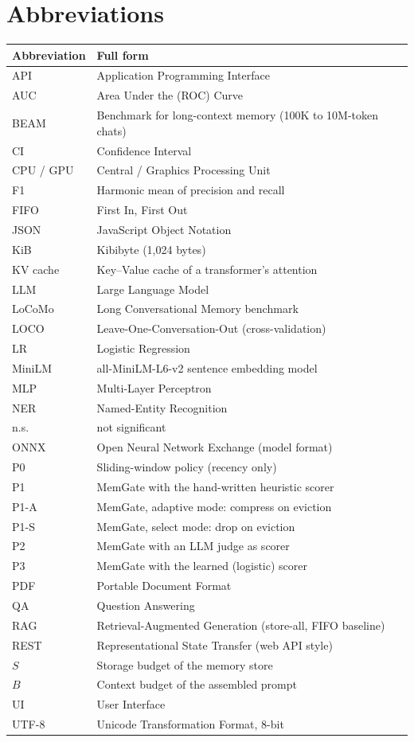 \chapter*{Abbreviations}
\begin{center}
\begin{longtable}{@{}p{3.2cm}p{10.5cm}@{}}
\toprule
\textbf{Abbreviation} & \textbf{Full form} \\
\midrule
\endhead
API & Application Programming Interface \\
AUC & Area Under the (ROC) Curve \\
BEAM & Benchmark for long-context memory (100K to 10M-token chats) \\
CI & Confidence Interval \\
CPU / GPU & Central / Graphics Processing Unit \\
F1 & Harmonic mean of precision and recall \\
FIFO & First In, First Out \\
JSON & JavaScript Object Notation \\
KiB & Kibibyte (1{,}024 bytes) \\
KV cache & Key--Value cache of a transformer's attention \\
LLM & Large Language Model \\
LoCoMo & Long Conversational Memory benchmark \\
LOCO & Leave-One-Conversation-Out (cross-validation) \\
LR & Logistic Regression \\
MiniLM & all-MiniLM-L6-v2 sentence embedding model \\
MLP & Multi-Layer Perceptron \\
NER & Named-Entity Recognition \\
n.s. & not significant \\
ONNX & Open Neural Network Exchange (model format) \\
P0 & Sliding-window policy (recency only) \\
P1 & MemGate with the hand-written heuristic scorer \\
P1-A & MemGate, adaptive mode: compress on eviction \\
P1-S & MemGate, select mode: drop on eviction \\
P2 & MemGate with an LLM judge as scorer \\
P3 & MemGate with the learned (logistic) scorer \\
PDF & Portable Document Format \\
QA & Question Answering \\
RAG & Retrieval-Augmented Generation (store-all, FIFO baseline) \\
REST & Representational State Transfer (web API style) \\
$S$ & Storage budget of the memory store \\
$B$ & Context budget of the assembled prompt \\
UI & User Interface \\
UTF-8 & Unicode Transformation Format, 8-bit \\
\bottomrule
\end{longtable}
\end{center}
